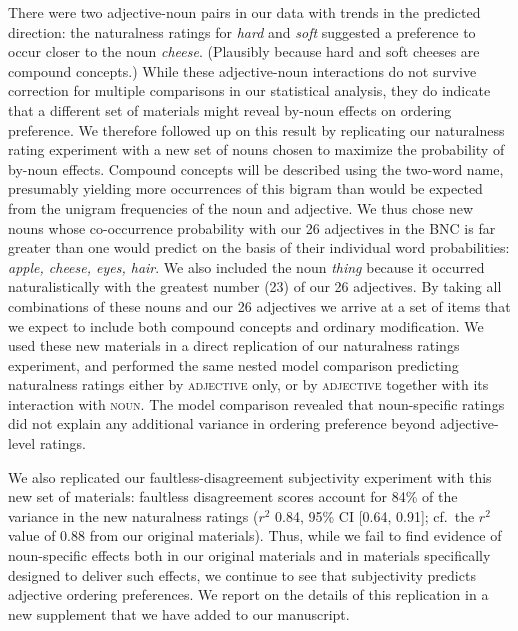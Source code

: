 \documentclass[12pt]{article}
\begin{document}
There were two adjective-noun pairs in our data with trends in the predicted direction: the naturalness ratings for \emph{hard} and \emph{soft} suggested a preference to occur closer to the noun \emph{cheese}. (Plausibly because hard and soft cheeses are compound concepts.) While these adjective-noun interactions do not survive correction for multiple comparisons in our statistical analysis, they do indicate that a different set of materials might reveal by-noun effects on ordering preference. We therefore followed up on this result by replicating our naturalness rating experiment with a new set of nouns chosen to maximize the probability of by-noun effects.
Compound concepts will be described using the two-word name, presumably yielding more occurrences of this bigram than would be expected from the unigram frequencies of the noun and adjective.
We thus chose new nouns whose co-occurrence probability with our 26 adjectives in the BNC is far greater than one would predict on the basis of their individual word probabilities: \emph{apple, cheese, eyes, hair}. We also included the noun \emph{thing} because it occurred naturalistically with the greatest number (23) of our 26 adjectives.
By taking all combinations of these nouns and our 26 adjectives we arrive at a set of items that we expect to include both compound concepts and ordinary modification.
We used these new materials in a direct replication of our naturalness ratings experiment, and performed the same nested model comparison predicting naturalness ratings either by \textsc{adjective} only, or by \textsc{adjective} together with its interaction with \textsc{noun}. The model comparison revealed that noun-specific ratings did not explain any additional variance in ordering preference beyond adjective-level ratings.

We also replicated our faultless-disagreement subjectivity experiment with this new set of materials: faultless disagreement scores account for 84\% of the variance in the new naturalness ratings ($r^2$ 0.84, 95\% CI [0.64,  0.91]; cf.~the $r^2$ value of 0.88 from our original materials). Thus, while we fail to find evidence of noun-specific effects both in our original materials and in materials specifically designed to deliver such effects, we continue to see that subjectivity predicts adjective ordering preferences. We report on the details of this replication in a new supplement that we have added to our manuscript.

\end{document}
